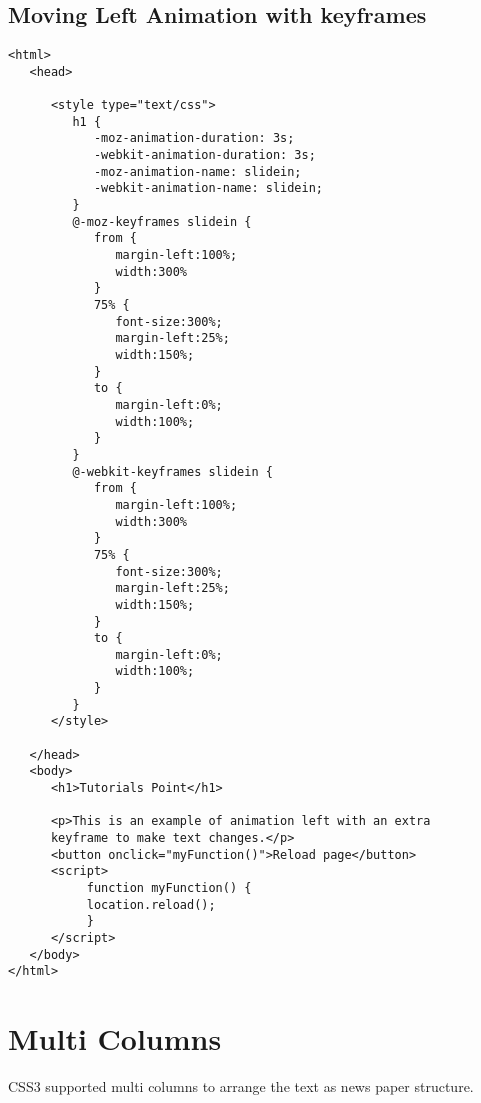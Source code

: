 \documentclass[a4paper,oneside]{book}
\numberwithin{equation}{chapter}
\begin{document}
\subsection{Moving Left Animation with keyframes}
\begin{verbatim}
<html>
   <head>
   
      <style type="text/css">
         h1 {
            -moz-animation-duration: 3s;
            -webkit-animation-duration: 3s;
            -moz-animation-name: slidein;
            -webkit-animation-name: slidein;
         }
         @-moz-keyframes slidein {
            from {
               margin-left:100%;
               width:300%
            }
            75% {
               font-size:300%;
               margin-left:25%;
               width:150%;
            }
            to {
               margin-left:0%;
               width:100%;
            }
         }
         @-webkit-keyframes slidein {
            from {
               margin-left:100%;
               width:300%
            }
            75% {
               font-size:300%;
               margin-left:25%;
               width:150%;
            }
            to {
               margin-left:0%;
               width:100%;
            }
         }
      </style>
      
   </head>
   <body>
      <h1>Tutorials Point</h1>
      
      <p>This is an example of animation left with an extra 
      keyframe to make text changes.</p>
	  <button onclick="myFunction()">Reload page</button>
      <script>
           function myFunction() {
           location.reload();
           }
      </script>
   </body>
</html>
\end{verbatim}
\section{Multi Columns}
CSS3 supported multi columns to arrange the text as news paper structure.
\end{document}
